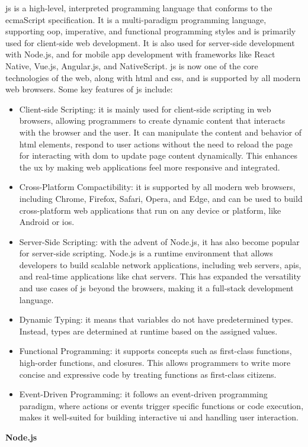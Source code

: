 \begin{multicols}{2}
      \acrshort{js} is a high-level, interpreted programming language that conforms to the \acrshort{ecma}Script specification.
      It is a multi-paradigm programming language, supporting \acrshort{oop}, imperative, and functional programming styles and
      is primarily used for client-side web development. It is also used for server-side development with Node.js, and for
      mobile app development with frameworks like React Native, Vue.js, Angular.js, and NativeScript. \acrshort{js} is now one
      of the core technologies of the web, along with \acrshort{html} and \acrshort{css}, and is supported by all modern web
      browsers. Some key features of \acrshort{js} include:
      \begin{itemize}
            \item Client-side Scripting: it is mainly used for client-side scripting in web browsers, allowing programmers to
                  create dynamic content that interacts with the browser and the user. It can manipulate the content and behavior
                  of \acrshort{html} elements, respond to user actions without the need to reload the page for interacting with
                  \acrshort{dom} to update page content dynamically. This enhances the \acrshort{ux} by making web applications
                  feel more responsive and integrated.
            \item Cross-Platform Compactibility: it is supported by all modern web browsers, including Chrome, Firefox, Safari,
                  Opera, and Edge, and can be used to build cross-platform web applications that run on any device or platform,
                  like Android or i\acrshort{os}.
            \item Server-Side Scripting: with the advent of Node.js, it has also become popular for server-side scripting. Node.js
                  is a runtime environment that allows developers to build scalable network applications, including web servers,
                  \acrshort{api}s, and real-time applications like chat servers. This has expanded the versatility and use cases of
                  \acrshort{js} beyond the browsers, making it a full-stack development language.
            \item Dynamic Typing: it means that variables do not have predetermined types. Instead, types are determined at runtime
                  based on the assigned values.
            \item Functional Programming: it supports concepts such as first-class functions, high-order functions, and closures.
                  This allows programmers to write more concise and expressive code by treating functions as first-class citizens.
            \item Event-Driven Programming: it follows an event-driven programming paradigm, where actions or events trigger specific
                  functions or code execution, makes it well-suited for building interactive \acrshort{ui} and handling user interaction.
      \end{itemize}
      \textbf{Node.js}


\end{multicols}

